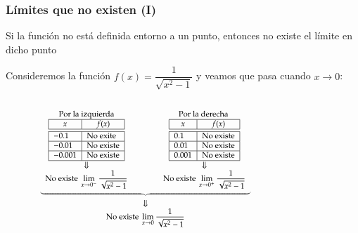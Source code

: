 \begin{frame}
\frametitle{Límites que no existen (I)}
Si la función no está definida entorno a un punto, entonces no existe el límite en dicho punto

 Consideremos la función $f(x)=\dfrac{1}{\sqrt{x^2-1}}$ y veamos que pasa cuando $x\rightarrow 0$:
\begin{columns}
\begin{column}{0.6\textwidth}
\[
\footnotesize
\begin{array}{c}
\underbrace{\begin{array}{ccc}
\textrm{Por la izquierda} & \qquad & \textrm{Por la derecha }\\
\begin{array}{|l|l|}
\hline
\multicolumn{1}{|c|}{x}      & \multicolumn{1}{c|}{f(x)}   \\
\hline\hline
 -0.1   & \textrm{No exite}      \\
\hline
 -0.01   & \textrm{No existe}     \\
\hline
 -0.001  & \textrm{No existe}   \\
\hline
\end{array}
& &
\begin{array}{|l|l|}
\hline
\multicolumn{1}{|c|}{x}      & \multicolumn{1}{c|}{f(x)}   \\
\hline\hline
 0.1    &  \textrm{No existe}      \\
\hline
 0.01   & \textrm{No existe}    \\
\hline
 0.001  & \textrm{No existe}   \\
\hline
\end{array}\\
\Downarrow & & \Downarrow\\
\displaystyle \textrm{No existe } \lim_{x\rightarrow 0^-}\frac{1}{\sqrt{x^2-1}}
& &
\displaystyle \textrm{No existe } \lim_{x\rightarrow 0^+}\frac{1}{\sqrt{x^2-1}}
\end{array}}\\
\Downarrow\\
\displaystyle \textrm{No existe }\lim_{x\rightarrow 0}\frac{1}{\sqrt{x^2-1}}
\end{array}
\]
\end{column}
\begin{column}{0.4\textwidth}
\begin{center}
\scalebox{1}{}
\end{center}
\end{column}
\end{columns}
\end{frame}


